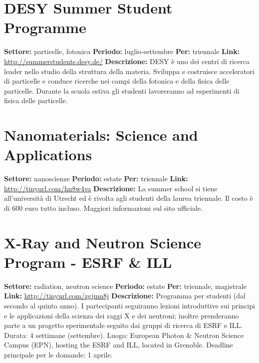 \documentclass[a4paper,10pt]{article}
\begin{document}
\section{DESY Summer Student Programme}
\textbf{Settore:} particelle, fotonica\newline
\textbf{Periodo:} luglio-settembre \newline
\textbf{Per:} triennale\newline
\textbf{Link:} \url{http://summerstudents.desy.de/} \newline
\textbf{Descrizione:}  DESY è uno dei centri di ricerca leader nello studio della struttura della materia. Sviluppa e costruisce acceleratori di particelle e conduce ricerche nei campi della fotonica e della fisica delle particelle. Durante la scuola estiva gli studenti lavoreranno ad esperimenti di fisica delle particelle.

\section{Nanomaterials: Science and Applications}
\textbf{Settore:} nanoscienze \newline
\textbf{Periodo:} estate \newline
\textbf{Per:} triennale\newline
\textbf{Link:} \url{http://tinyurl.com/hn8w4va} \newline
\textbf{Descrizione:} La summer school si tiene all'università di Utrecht ed è rivolta agli studenti della laurea triennale. Il costo è di 600 euro tutto incluso. Maggiori informazioni sul sito ufficiale.  

\section{X-Ray and Neutron Science Program - ESRF \& ILL} 
\textbf{Settore:} radiation, neutron science\newline
\textbf{Periodo:} estate\newline
\textbf{Per:} triennale, magistrale\newline
\textbf{Link:} \url{http://tinyurl.com/zgjmn8j} \newline
\textbf{Descrizione:} Programma per studenti (dal secondo al quinto anno). I partecipanti seguiranno lezioni introduttive sui principi e le applicazioni della scienza dei raggi X e dei neutroni; inoltre prenderanno parte a un progetto sperimentale seguito dai gruppi di ricerca di ESRF e ILL. Durata: 4 settimane (settembre). Luogo: European Photon \& Neutron Science Campus (EPN), hosting the ESRF and ILL, located in Grenoble. Deadline principale per le domande: 1 aprile.
\end{document}
